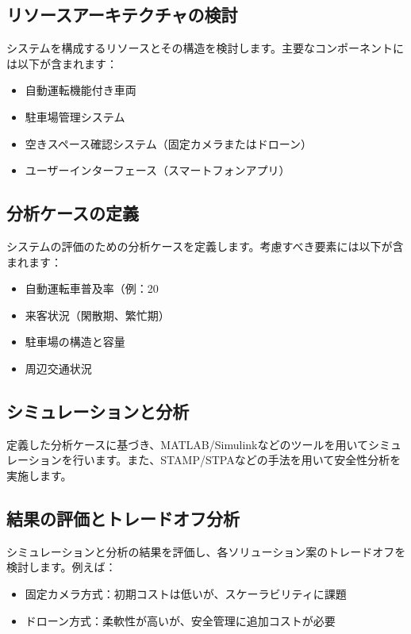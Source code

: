 \subsection{リソースアーキテクチャの検討}

システムを構成するリソースとその構造を検討します。主要なコンポーネントには以下が含まれます：

\begin{itemize}
    \item 自動運転機能付き車両
    \item 駐車場管理システム
    \item 空きスペース確認システム（固定カメラまたはドローン）
    \item ユーザーインターフェース（スマートフォンアプリ）
\end{itemize}

\subsection{分析ケースの定義}

システムの評価のための分析ケースを定義します。考慮すべき要素には以下が含まれます：

\begin{itemize}
    \item 自動運転車普及率（例：20%
    \item 来客状況（閑散期、繁忙期）
    \item 駐車場の構造と容量
    \item 周辺交通状況
\end{itemize}

\subsection{シミュレーションと分析}

定義した分析ケースに基づき、MATLAB/Simulinkなどのツールを用いてシミュレーションを行います。また、STAMP/STPAなどの手法を用いて安全性分析を実施します。

\subsection{結果の評価とトレードオフ分析}

シミュレーションと分析の結果を評価し、各ソリューション案のトレードオフを検討します。例えば：

\begin{itemize}
    \item 固定カメラ方式：初期コストは低いが、スケーラビリティに課題
    \item ドローン方式：柔軟性が高いが、安全管理に追加コストが必要
\end{itemize}

